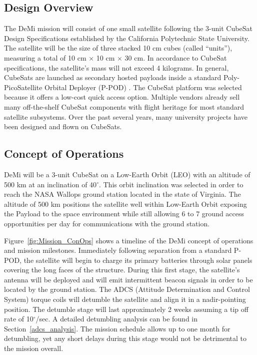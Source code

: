 \documentclass[12pt]{article}
\begin{document}
		\subsection{Design Overview}
		The DeMi mission will consist of one small satellite following the 3-unit CubeSat Design Specifications established by the California Polytechnic State University. The satellite will be the size of three stacked 10 cm cubes (called ``units''), measuring a total of 10 cm $\times$ 10 cm $\times$ 30 cm. In accordance to CubeSat specifications, the satellite's mass will not exceed 4 kilograms. In general, CubeSats are launched as secondary hosted payloads inside a standard Poly-PicoSatellite Orbital Deployer (P-POD) \cite{cubesat-specs}.
The CubeSat platform was selected because it offers a low-cost quick access option. Multiple vendors already sell many off-the-shelf CubeSat components with flight heritage for most standard satellite subsystems. Over the past several years, many university projects have been designed and flown on CubeSats. 


		\subsection{Concept of Operations}\label{sec:systems_conops}

		DeMi will be a 3-unit CubeSat on a Low-Earth Orbit (LEO) with an altitude of 500 km at an inclination of 40$^\circ$. This orbit inclination was selected in order to reach the NASA Wallops ground station located in the state of Virginia. The altitude of 500 km positions the satellite well within Low-Earth Orbit exposing the Payload to the space environment while still allowing 6 to 7 ground access opportunities per day for communications with the ground station. 

Figure~\ref{fig:Mission_ConOps} shows a timeline of the DeMi concept of operations and mission milestones. Immediately following separation from a standard P-POD, the satellite will begin to charge its primary batteries through solar panels covering the long faces of the structure. During this first stage, the satellite's antenna will be deployed and will emit intermittent beacon signals in order to be located by the ground station. The ADCS (Attitude Determination and Control System) torque coils will detumble the satellite and align it in a nadir-pointing position. The detumble stage will last approximately 2 weeks assuming a tip off rate of 10$^\circ$/sec. A detailed detumbling analysis can be found in Section~\ref{adcs_analysis}. The mission schedule allows up to one month for detumbling, yet any short delays during this stage would not be detrimental to the mission overall.
\end{document}
